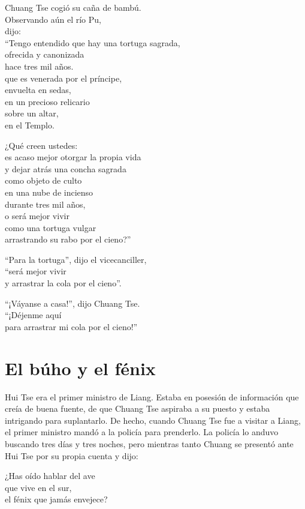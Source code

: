 \documentclass[hidelinks]{memoir}
\begin{document}
	Chuang Tse cogió su caña de bambú.\\
	Observando aún el río Pu,\\
	dijo:\\
	``Tengo entendido que hay una tortuga sagrada,\\
	ofrecida y canonizada\\
	hace tres mil años.\\
	que es venerada por el príncipe,\\
	envuelta en sedas,\\
	en un precioso relicario\\
	sobre un altar,\\
	en el Templo.
	
	¿Qué creen ustedes:\\
	es acaso mejor otorgar la propia vida\\
	y dejar atrás una concha sagrada\\
	como objeto de culto\\
	en una nube de incienso\\
	durante tres mil años,\\
	o será mejor vivir\\
	como una tortuga vulgar\\
	arrastrando su rabo por el cieno?''
	
	``Para la tortuga'', dijo el vicecanciller,\\
	``será mejor vivir\\
	y arrastrar la cola por el cieno''.
	
	``¡Váyanse a casa!'', dijo Chuang Tse.\\
	``¡Déjenme aquí\\
	para arrastrar mi cola por el cieno!''
	
	\chapter*{El búho y el fénix}
	
	Hui Tse era el primer ministro de Liang. Estaba en posesión de
	información que creía de buena fuente, de que Chuang Tse aspiraba a su
	puesto y estaba intrigando para suplantarlo. De hecho, cuando Chuang Tse
	fue a visitar a Liang, el primer ministro mandó a la policía para
	prenderlo. La policía lo anduvo buscando tres días y tres noches, pero
	mientras tanto Chuang se presentó ante Hui Tse por su propia cuenta y
	dijo:
	
	¿Has oído hablar del ave\\
	que vive en el sur,\\
	el fénix que jamás envejece?
	
\end{document}
